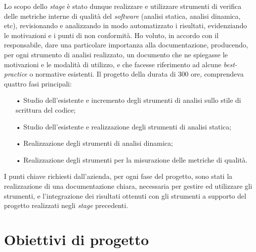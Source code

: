 Lo scopo dello \textit{stage} è stato dunque realizzare e utilizzare strumenti di verifica delle metriche interne di qualità del 
\textit{software} (analisi statica, analisi dinamica, etc), revisionando e analizzando in modo automatizzato i risultati, evidenziando le motivazioni e i punti di non conformità. Ho voluto, in accordo con il responsabile, dare una particolare importanza alla documentazione, producendo, per ogni strumento di analisi realizzato, un documento che ne spiegasse le motivazioni e le modalità di utilizzo, e che facesse riferimento ad alcune \textit{best-practice} o normative esistenti. Il progetto della durata di 300 ore, comprendeva quattro fasi principali:
\begin{itemize}
\item[•] Studio dell'esistente e incremento degli strumenti di analisi sullo stile di scrittura del codice;
\item[•] Studio dell'esistente e realizzazione degli strumenti di analisi statica;
\item[•] Realizzazione degli strumenti di analisi dinamica;
\item[•] Realizzazione degli strumenti per la misurazione delle metriche di qualità.
\end{itemize}

I punti chiave richiesti dall'azienda, per ogni fase del progetto, sono stati la realizzazione di una documentazione chiara, necessaria per gestire ed utilizzare gli strumenti, e l'integrazione dei risultati ottenuti con gli strumenti a supporto del progetto realizzati negli \textit{stage} precedenti.




\section{Obiettivi di progetto}

